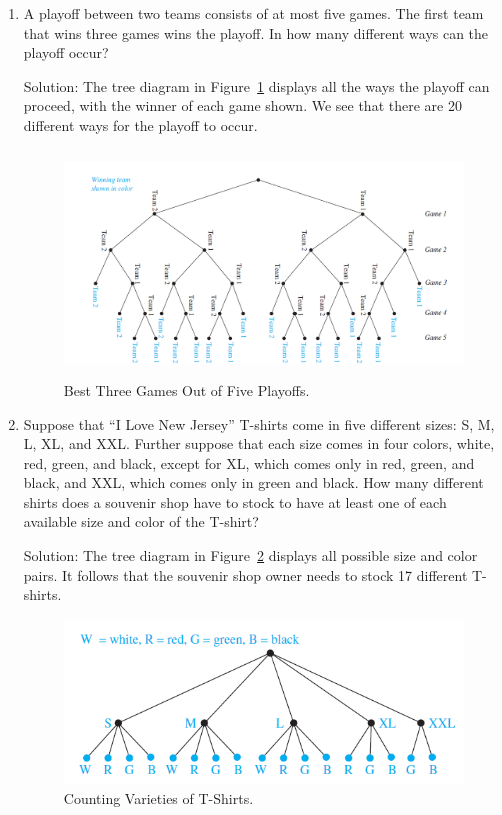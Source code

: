 \documentclass[11pt,a4paper]{book}
\begin{document}
\begin{enumerate}[label=Example~\arabic*]
\item A playoff between two teams consists of at most five games.
The first team that wins three games wins the playoff.
In how many different ways can the playoff occur?

Solution: The tree diagram in Figure~\ref{fig:ex22} displays all the ways the playoff can proceed, with the winner of each game shown.
We see that there are 20 different ways for the playoff to occur.

\begin{figure}[h]
\centering
\includegraphics[height=6cm,width=1.2\textwidth]{images/exemplo22.png}
\caption{Best Three Games Out of Five Playoffs.}
\label{fig:ex22}
\end{figure}

\item Suppose that “I Love New Jersey” T-shirts come in five different sizes: S, M, L, XL, and XXL.
Further suppose that each size comes in four colors, white, red, green, and black, except for XL, which comes only in red, green, and black, and XXL, which comes only in green and black.
How many different shirts does a souvenir shop have to stock to have at least one of each available size and color of the T-shirt?

Solution: The tree diagram in Figure~\ref{fig:ex23} displays all possible size and color pairs.
It follows that the souvenir shop owner needs to stock 17 different T-shirts.

\begin{figure}[h]
\centering
\includegraphics{images/exemplo23.png}
\caption{Counting Varieties of T-Shirts.}
\label{fig:ex23}
\end{figure}

\end{enumerate}
\end{document}
